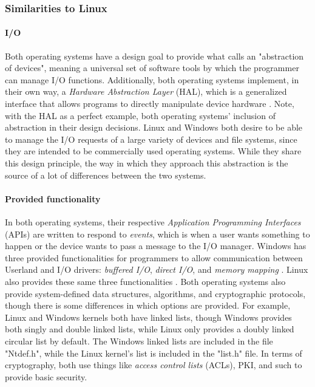 \documentclass[letterpaper,10pt,titlepage]{article}
\begin{document}
\subsubsection{Similarities to Linux}

% 
%
%

\paragraph{I/O}
Both operating systems have a design goal to provide what \cite{windowsInt2} calls an "abstraction of devices", meaning a universal set of software tools by which the programmer can manage I/O functions. Additionally, both operating systems implement, in their own way, a \emph{Hardware Abstraction Layer} (HAL), which is a generalized interface that allows programs to directly manipulate device hardware \cite{windowsInt1}.
Note, with the HAL as a perfect example, both operating systems' inclusion of abstraction in their design decisions. Linux and Windows both desire to be able to manage the I/O requests of a large variety of devices and file systems, since they are intended to be commercially used operating systems. While they share this design principle, the way in which they approach this abstraction is the source of a lot of differences between the two systems.

\paragraph{Provided functionality}
In both operating systems, their respective \emph{Application Programming Interfaces} (APIs) are written to respond to \emph{events}, which is when a user wants something to happen or the device wants to pass a message to the I/O manager. Windows has three provided functionalities for programmers to allow communication between Userland and I/O drivers: \emph{buffered I/O}, \emph{direct I/O}, and \emph{memory mapping} \cite{windowsSys}. Linux also provides these same three functionalities \cite{linux}. Both operating systems also provide system-defined data structures, algorithms, and cryptographic protocols, though there is some differences in which options are provided. For example, Linux and Windows kernels both have linked lists, though Windows provides both singly and double linked lists, while Linux only provides a doubly linked circular list by default. The Windows linked lists are included in the file "Ntdef.h", while the Linux kernel's list is included in the "list.h" file. In terms of cryptography, both use things like \emph{access control lists} (ACLs), PKI, and such to provide basic security. 
\end{document}
